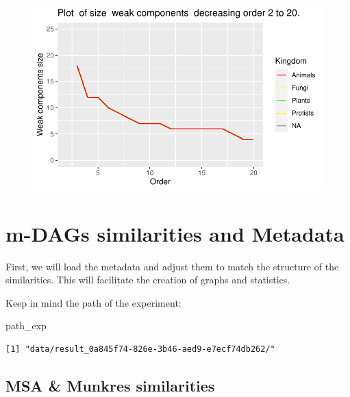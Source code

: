\documentclass[
  letterpaper,
  DIV=11,
  numbers=noendperiod]{scrreprt}
\newenvironment{Shaded}{}{}
\newcommand{\NormalTok}[1]{\textcolor[rgb]{0.67,0.70,0.75}{#1}}
\begin{document}
\begin{figure}[H]

{\centering \includegraphics[width=1\textwidth,height=\textheight]{index_files/figure-pdf/unnamed-chunk-30-1.pdf}

}

\end{figure}


\hypertarget{m-dags-similarities-and-metadata}{%
\chapter{m-DAGs similarities and
Metadata}\label{m-dags-similarities-and-metadata}}

First, we will load the metadata and adjust them to match the structure
of the similarities. This will facilitate the creation of graphs and
statistics.

Keep in mind the path of the experiment:

\begin{Shaded}
\begin{Highlighting}[]
\NormalTok{path\_exp}
\end{Highlighting}
\end{Shaded}

\begin{verbatim}
[1] "data/result_0a845f74-826e-3b46-aed9-e7ecf74db262/"
\end{verbatim}

\hypertarget{msa-munkres-similarities}{%
\section{MSA \& Munkres similarities}\label{msa-munkres-similarities}}
\end{document}
